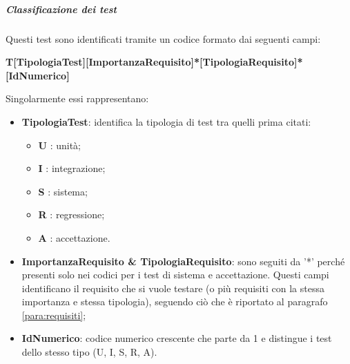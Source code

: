 \subparagraph{Classificazione dei test}
Questi test sono identificati tramite un codice formato dai seguenti campi:
\begin{center}
\textbf{T[TipologiaTest][ImportanzaRequisito]*[TipologiaRequisito]*[IdNumerico]} 
\end{center}
Singolarmente essi rappresentano:
\begin{itemize}
	\item \textbf{TipologiaTest}: identifica la tipologia di test tra quelli prima citati:
		\begin{itemize}
			\item \textbf{U} : unità;
			\item \textbf{I} : integrazione;
			\item \textbf{S} : sistema;
			\item \textbf{R} : regressione;
			\item \textbf{A} : accettazione.			 
		\end{itemize}
	\item \textbf{ImportanzaRequisito \& TipologiaRequisito}: sono seguiti da '*' perché presenti solo nei codici per i test di sistema e accettazione. Questi campi identificano il requisito che si vuole testare (o più requisiti con la stessa importanza e stessa tipologia), seguendo ciò che è riportato al paragrafo \ref{para:requisiti};
	\item \textbf{IdNumerico}: codice numerico crescente che parte da 1 e distingue i test dello stesso tipo (U, I, S, R, A).
\end{itemize}
 

